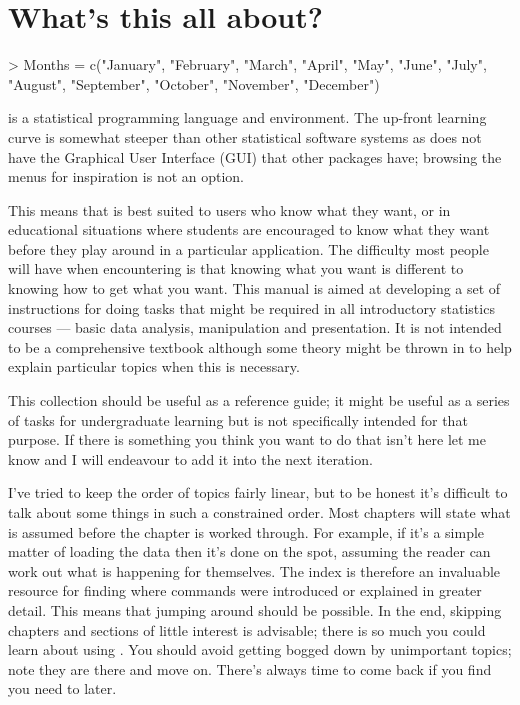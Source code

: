 

 
\chapter{What's this all about?} 
\label{Intro} 
 
\begin{Schunk}
\begin{Sinput}
> Months = c("January", "February", "March", "April", "May", "June", "July", "August", "September", "October", "November", "December")  
\end{Sinput}
\end{Schunk}
 
\R{} is a statistical programming language and environment. The up-front learning curve is somewhat steeper than other statistical software systems as \R{} does not have the Graphical User Interface (GUI) that other packages have; browsing the menus for inspiration is not an option. 
 
This means that \R{} is best suited to users who know what they want, or in educational situations where students are encouraged to know what they want before they play around in a particular application. The difficulty most people will have when encountering \R{} is that knowing what you want is different to knowing how to get what you want. This manual is aimed at developing a set of instructions for doing tasks that might be required in all introductory statistics courses --- basic data analysis, manipulation and presentation. It is not intended to be a comprehensive textbook although some theory might be thrown in to help explain particular topics when this is necessary. 
 
This collection should be useful as a reference guide; it might be useful as a series of tasks for undergraduate learning but is not specifically intended for that purpose. If there is something you think you want to do that isn't here let me know and I will endeavour to add it into the next iteration. 
 
I've tried to keep the order of topics fairly linear, but to be honest it's difficult to talk about some things in such a constrained order. Most chapters will state what is assumed before the chapter is worked through. For example, if it's a simple matter of loading the data then it's done on the spot, assuming the reader can work out what is happening for themselves. The index is therefore an invaluable resource for finding where commands were introduced or explained in greater detail. This means that jumping around should be possible.  
In the end, skipping chapters and sections of little interest is advisable; there is so much you could learn about using \R{}. You should avoid getting bogged down by unimportant topics; note they are there and move on. There's always time to come back if you find you need to later. 
 
